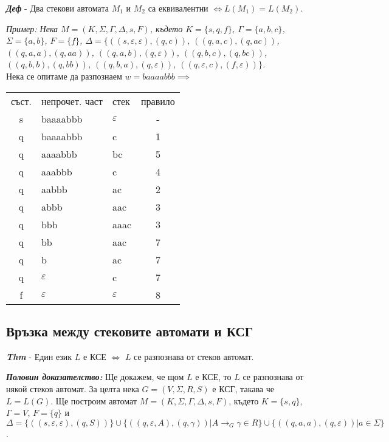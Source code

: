 \documentclass[fleqn,12pt]{article}
\begin{document}
\noindent\textit{\textbf{Деф}} - Два стекови автомата $M_1$ и $M_2$ са еквивалентни $\iff L(M_1) = L(M_2)$.

\noindent\textit{Пример: Нека $M = (K, \Sigma, \Gamma, \Delta, s, F)$, където $K = \{s, q, f\}$, $\Gamma = \{a, b, c\}$, $\Sigma = \{a, b\}$, $F = \{f\}$, $\Delta = \{$$((s, \varepsilon, \varepsilon), (q, c))$, $((q, a, c), (q, ac))$, $((q, a, a), (q, aa))$, $((q, a, b), (q, \varepsilon))$, $((q, b, c), (q, bc))$, $((q, b, b), (q, bb))$, $((q, b, a), (q, \varepsilon))$, $((q, \varepsilon, c), (f, \varepsilon))$$\}$.} \\

Нека се опитаме да разпознаем $w = baaaabbb \implies$

\begin{tabular}{ |c|l|l|c| } 
 \hline
 съст. & непрочет. част & стек & правило \\ 
 s & baaaabbb & $\varepsilon$ & - \\
 q & baaaabbb & c & 1 \\
 q & aaaabbb & bc & 5 \\
 q & aaabbb & c & 4 \\
 q & aabbb & ac & 2 \\
 q & abbb & aac & 3 \\
 q & bbb & aaac & 3 \\
 q & bb & aac & 7 \\
 q & b & ac & 7 \\
 q & $\varepsilon$ & c & 7 \\
 f & $\varepsilon$ & $\varepsilon$ & 8 \\
 \hline
\end{tabular}

\subsection{Връзка между стековите автомати и КСГ}

\noindent\textit{\textbf{Thm}} - Един език $L$ е КСЕ $\iff$ $L$ се разпознава от стеков автомат.

\noindent\textit{\textbf{Половин доказателство:}}
Ще докажем, че щом $L$ е КСЕ, то $L$ се разпознава от някой стеков автомат. За целта нека $G = (V, \Sigma, R, S)$ е КСГ, такава че $L = L(G)$. Ще построим автомат $M = (K, \Sigma, \Gamma, \Delta, s, F)$, където $K = \{s, q\}$, $\Gamma = V$, $F = \{q\}$ и $\Delta = \{((s, \varepsilon, \varepsilon), (q, S))\} \cup \{((q, \varepsilon, A), (q, \gamma)) | A \to_G \gamma \in R\} \cup \{((q, a, a), (q, \varepsilon)) | a \in \Sigma\}$.
\end{document}
